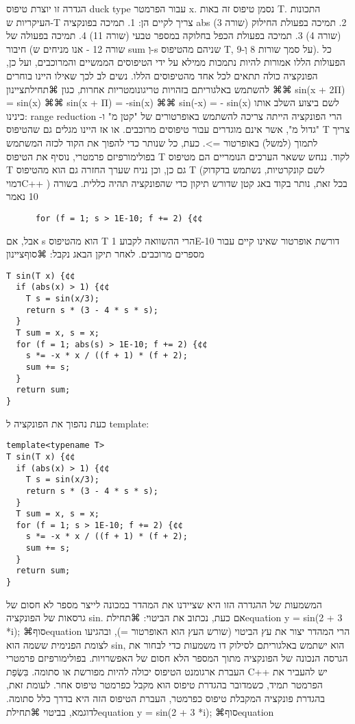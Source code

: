       הגדרה זו יוצרת טיפוס duck type עבור הפרמטר x. נסמן טיפוס זה באות T. התכונות העיקריות ש-T צריך לקיים הן:
      1. תמיכה בפונקציה abs (שורה 3)
      2. תמיכה בפעולת החילוק (שורה 4)
      3. תמיכה בפעולת הכפל בחלוקה במספר טבעי (שורה 11)
      4. תמיכה בפעולה של חיבור (שורה 12 - אנו מניחים ש sum וְ-s שניהם מהטיפוס T, על סמך שורות 8 וְ-9).
      כל הפעולות הללו אמורות להיות נתמכות ממילא על ידי הטיפוסים הממשיים והמרוכבים, ועל כן, הפונקציה כולה תתאים לכל אחד מהטיפוסים הללו.
      נשים לב לכך שאילו היינו בוחרים להשתמש באלגוריתם בזהויות טריגונומטריות אחרות, כגון
      ⌘תחילת{ציינון}
      ⌘⌘ sin(x + 2Π) = sin(x)
      ⌘⌘ sin(x + Π) = -sin(x)
      ⌘⌘ sin(-x) = - sin(x)
      לשם ביצוע השלב אותו כינינו: range reduction הרי הפונקציה הייתה צריכה להשתמש באופרטורים של "קטן מ" ו- "גדול מ", אשר אינם מוגדרים עבור טיפוסים מרוכבים. או אז היינו מגלים גם שהטיפוס T צריך לתמוך (למשל) באופרטור =>.
      כעת, כל שנותר כדי להפוך את הקוד לכזה המשתמש בפולימורפיזם פרמטרי, נוסיף את הטיפוס T לקוד. ננחש ששאר הערכים הנומריים הם מטיפוס T גם כן, וכן נניח שערך החזרה גם הוא מהטיפוס T (לשם קונקרטיות, נשתמש בדקדוק דמויC++ )
      בכל זאת, נותר בקוד באג קטן שדורש תיקון כדי שהפונקציה תהיה כללית. בשורה 10 נאמר
\begin{verbatim}
      for (f = 1; s > 1E-10; f += 2) {¢¢
\end{verbatim}
        אבל, אם s הוא מהטיפוס T הרי ההשוואה לקבוע 1E-10 דורשת אופרטור שאינו קיים עבור מספרים מרוכבים. לאחר תיקן הבאג נקבל:
    ⌘סוף{ציינון}


\begin{verbatim}
T sin(T x) {¢¢
  if (abs(x) > 1) {¢¢
    T s = sin(x/3);
    return s * (3 - 4 * s * s);
  }
  T sum = x, s = x;
  for (f = 1; abs(s) > 1E-10; f += 2) {¢¢
    s *= -x * x / ((f + 1) * (f + 2);
    sum += s;
  }
  return sum;
}
\end{verbatim}

        כעת נהפוך את הפונקציה ל template:

\begin{verbatim}
template<typename T>
T sin(T x) {¢¢
  if (abs(x) > 1) {¢¢
    T s = sin(x/3);
    return s * (3 - 4 * s * s);
  }
  T sum = x, s = x;
  for (f = 1; s > 1E-10; f += 2) {¢¢
    s *= -x * x / ((f + 1) * (f + 2);
    sum += s;
  }
  return sum;
}
\end{verbatim}

המשמעות של ההגדרה הזו היא שציידנו את המהדר במכונה לייצר מספר לא חסום של גרסאות של הפונקציה sin. אם כעת, נכתוב את הביטוי:
⌘תחילת{equation}
        y = sin(2 + 3 *i);
⌘סוף{equation}
הרי המהדר יצור את עץ הביטוי (שורש העץ הוא האופרטור =), ובהגיעו לצומת הפנימית
ששמה הוא sin, הוא ישתמש באלגוריתם לסילוק דו משמעות כדי לבחור את הגרסה הנכונה של
הפונקציה מתוך המספר הלא חסום של האפשרויות.  בפולימורפיזם פרמטרי העברת ארגומנט
הטיפוס יכולה להיות מפורשת או סתומה. בִּשְׂפַת C++ יש להעביר את הפרמטר תמיד, כשמדובר
בהגדרת טיפוס הוא מקבל כפרמטר טיפוס אחר. לעומת זאת, בהגדרת פונקציה המקבלת טיפוס
כפרמטר, העברת הטיפוס הזה היא בדרך כלל סתומה.  לדוגמא, בביטוי
⌘תחילת{equation}
        y = sin(2 + 3 *i);
⌘סוף{equation}

